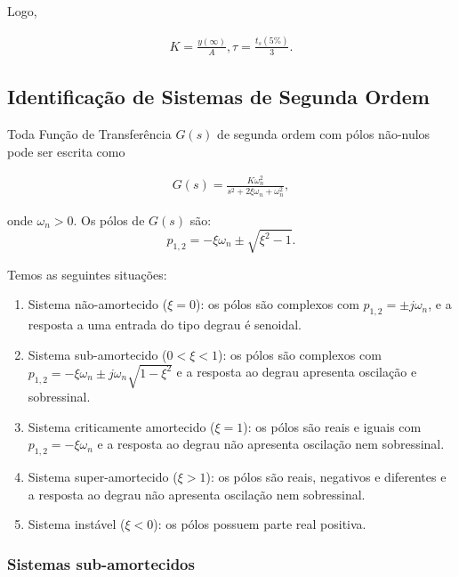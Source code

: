 \documentclass[
]{book}
\providecommand{\tightlist}{%
  \setlength{\itemsep}{0pt}\setlength{\parskip}{0pt}}
\begin{document}
Logo,

\begin{align}
K = \frac{y(\infty)}{A},  \tau = \frac {t_s(5\%)}{3}. \label{eq:eq32}
\end{align}

\hypertarget{identificauxe7uxe3o-de-sistemas-de-segunda-ordem}{%
\subsection*{Identificação de Sistemas de Segunda Ordem}\label{identificauxe7uxe3o-de-sistemas-de-segunda-ordem}}

Toda Função de Transferência \(G(s)\) de segunda ordem com pólos não-nulos pode ser escrita como

\begin{align}
G(s) = \frac {K \omega_n^2}{s^2+2\xi \omega_n+ \omega_n^2}, \label{eq:eq33}
\end{align}

onde \(\omega_n > 0\). Os pólos de \(G(s)\) são:
\[
p_{1,2} = - \xi \omega_n \pm \sqrt{\xi^2 -1}.
\]

Temos as seguintes situações:

\begin{enumerate}
\def\labelenumi{\arabic{enumi}.}
\tightlist
\item
  Sistema não-amortecido (\(\xi = 0\)): os pólos são complexos com \(p_{1,2} = \pm j \omega_n\), e a resposta a uma entrada do tipo degrau é senoidal.
\item
  Sistema sub-amortecido (\(0< \xi <1\)): os pólos são complexos com \(p_{1,2} = - \xi \omega_n \pm j \omega_n\sqrt{1 - \xi^2}\) e a resposta ao degrau apresenta oscilação e sobressinal.
\item
  Sistema criticamente amortecido (\(\xi = 1\)): os pólos são reais e iguais com \(p_{1,2} = -\xi \omega_n\) e a resposta ao degrau não apresenta oscilação nem sobressinal.
\item
  Sistema super-amortecido (\(\xi >1\)): os pólos são reais, negativos e diferentes e a resposta ao degrau não apresenta oscilação nem sobressinal.
\item
  Sistema instável (\(\xi < 0\)): os pólos possuem parte real positiva.
\end{enumerate}

\hypertarget{sistemas-sub-amortecidos}{%
\subsubsection*{Sistemas sub-amortecidos}\label{sistemas-sub-amortecidos}}
\end{document}
